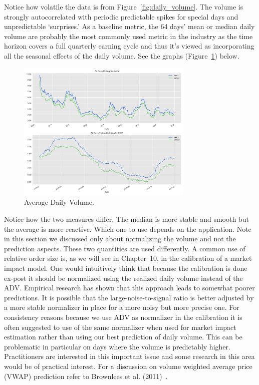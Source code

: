 Notice how volatile the data is from Figure~\ref{fig:daily_volume}. The volume is strongly autocorrelated with periodic predictable spikes for special days and unpredictable `surprises.' As a baseline metric, the 64 days' mean or median daily volume are probably the most commonly used metric in the industry as the time horizon covers a full quarterly earning cycle and thus it's viewed as incorporating all the seasonal effects of the daily volume. See the graphs (Figure~\ref{fig:adv}) below.
	
	\begin{figure}[!ht]
		\centering
			\includegraphics[width=0.75\textwidth]{chapters/chapter_trade_data_models/figures/adv.png} 
		\caption{Average Daily Volume.\label{fig:adv}}
	\end{figure}
Notice how the two measures differ. The median is more stable and smooth but the average is more reactive. Which one to use depends on the application. Note in this section we discussed only about normalizing the volume and not the prediction aspects. These two quantities are used differently. A common use of relative order size is, as we will see in Chapter~10, in the calibration of a market impact model. One would intuitively think that because the calibration is done ex-post it should be normalized using the realized daily volume instead of the ADV. Empirical research has shown that this approach leads to somewhat poorer predictions. It is possible that the large-noise-to-signal ratio is better adjusted by a more stable normalizer in place for a more noisy but more precise one. For consistency reasons because we use ADV as normalizer in the calibration it is often suggested to use of the same normalizer when used for market impact estimation rather than using our best prediction of daily volume. This can be problematic in particular on days where the volume is predictably higher. Practitioners are interested in this important issue and some research in this area would be of practical interest. For a discussion on volume weighted average price (VWAP) prediction refer to Brownlees et al. (2011)~\cite{brownless}.



